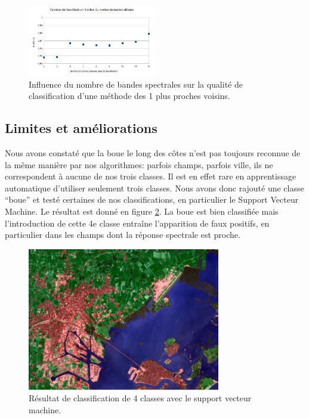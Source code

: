 \documentclass[a4paper,10pt]{article}
\begin{document}
\begin{figure}[H]
  \centering
    \includegraphics[width=0.5\textwidth]{nb_bands}
  \caption{Influence du nombre de bandes spectrales sur la qualité de classification d'une méthode des 1 plus proches voisins.}
  \label{fig:nBandes}
\end{figure}

\subsection{Limites et améliorations}
Nous avons constaté que la boue le long des côtes n'est pas toujours reconnue de la même manière par nos algorithmes: parfois champs, parfois ville, ils ne correspondent à aucune de nos trois classes. Il est en effet rare en apprentissage automatique d'utiliser seulement trois classes. Nous avons donc rajouté une classe ``boue'' et testé certaines de nos classifications, en particulier le Support Vecteur Machine. Le résultat est donné en figure \ref{fig:SVM4Cl}. La boue est bien classifiée mais l'introduction de cette 4e classe entraîne l'apparition de faux positifs, en particulier dans les champs dont la réponse spectrale est proche.
\begin{figure}[H]
  \centering
    \includegraphics[width=0.75\textwidth]{SVM4Classes}
  \caption{Résultat de classification de 4 classes avec le support vecteur machine.}
  \label{fig:SVM4Cl}
\end{figure}
\end{document}
